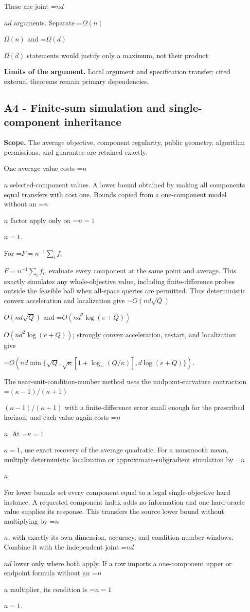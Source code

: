 \documentclass[10pt,a4paper]{article}
\newcommand{\AtlasMath}[1]{\par\begingroup\centering\setbox0=\hbox{$\displaystyle #1$}\ifdim\wd0>1.4\linewidth\typeout{ATLAS WIDE FORMULA: \the\wd0}\fi\ifdim\wd0>\linewidth\resizebox{\linewidth}{!}{\box0}\else\box0\fi\par\endgroup}
\newcommand{\AtlasInlineMath}[1]{\begingroup\setbox0=\hbox{$#1$}\ifdim\wd0>.4\linewidth\endgroup\AtlasMath{#1}\else\endgroup$#1$\fi}
\begin{document}
These are joint \AtlasInlineMath{nd} arguments. Separate \AtlasInlineMath{\Omega(n)} and \AtlasInlineMath{\Omega(d)} statements would justify only a maximum, not their product.

\textbf{Limits of the argument.} Local argument and specification transfer; cited external theorems remain primary dependencies.

\subsection{A4 - Finite-sum simulation and single-component inheritance}
\textbf{Scope.} The average objective, component regularity, public geometry, algorithm permissions, and guarantee are retained exactly.

One average value costs \AtlasInlineMath{n} selected-component values. A lower bound obtained by making all components equal transfers with cost one. Bounds copied from a one-component model without an \AtlasInlineMath{n} factor apply only on \AtlasInlineMath{n=1}.

For \AtlasInlineMath{F=n^{-1}\sum_i f_i}, evaluate every component at the same point and average. This exactly simulates any whole-objective value, including finite-difference probes outside the feasible ball when all-space queries are permitted. Thus deterministic convex acceleration and localization give \AtlasInlineMath{O(nd\sqrt Q)} and \AtlasInlineMath{O(nd^2\log(e+Q))}; strongly convex acceleration, restart, and localization give

\AtlasMath{O\!\left(nd\min\{\sqrt Q,\sqrt\kappa[1+\log_+(Q/\kappa)],d\log(e+Q)\}\right).}

The near-unit-condition-number method uses the midpoint-curvature contraction \AtlasInlineMath{(\kappa-1)/(\kappa+1)} with a finite-difference error small enough for the prescribed horizon, and each value again costs \AtlasInlineMath{n}. At \AtlasInlineMath{\kappa=1}, use exact recovery of the average quadratic. For a nonsmooth mean, multiply deterministic localization or approximate-subgradient simulation by \AtlasInlineMath{n}.

For lower bounds set every component equal to a legal single-objective hard instance. A requested component index adds no information and one hard-oracle value supplies its response. This transfers the source lower bound without multiplying by \AtlasInlineMath{n}, with exactly its own dimension, accuracy, and condition-number windows. Combine it with the independent joint \AtlasInlineMath{nd} lower only where both apply. If a row imports a one-component upper or endpoint formula without an \AtlasInlineMath{n} multiplier, its condition is \AtlasInlineMath{n=1}.
\end{document}
